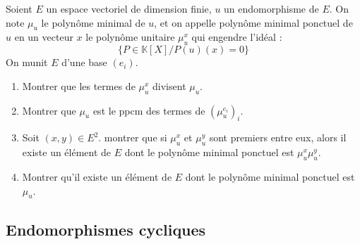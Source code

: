 \begin{exer}
Soient $E$ un espace vectoriel de dimension finie, $u$ un endomorphisme de $E$. %
On note $\mu_u$ le polynôme minimal de $u$, et on appelle polynôme minimal ponctuel de $u$ en un vecteur $x$ %
le polynôme unitaire $\mu_u^x$ qui engendre l'idéal :\[\{ P \in \mathbb{K}[X] / P(u)(x) = 0\}\]
On munit $E$ d'une base $(e_i)$.
\begin{enumerate}
\item Montrer que les termes de $\mu_u^x$ divisent $\mu_u$.
\item Montrer que $\mu_u$ est le ppcm des termes de $(\mu_u^{e_i})_i$.
\item Soit $(x,y) \in E^2$. montrer que si $\mu_u^x$ et $\mu_u^y$ sont premiers entre eux, %
alors il existe un élément de $E$ dont le polynôme minimal ponctuel est $\mu_u^x\mu_u^y$.
\item Montrer qu'il existe un élément de $E$ dont le polynôme minimal ponctuel est $\mu_u$.
\end{enumerate}
\end{exer}

\subsection{Endomorphismes cycliques}

